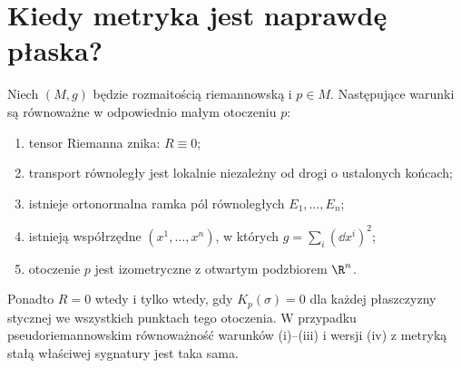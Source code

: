 \section{Kiedy metryka jest naprawdę płaska?}

\begin{twierdzenie}
\label{thm:lokalna-plaskosc}
Niech $(M,g)$ będzie rozmaitością riemannowską
i $p\in M$. Następujące warunki są równoważne
w odpowiednio małym otoczeniu $p$:
\begin{enumerate}[label=\textup{(\roman*)}]
 \item tensor Riemanna znika: $R\equiv0$;
 \item transport równoległy jest lokalnie niezależny
       od drogi o ustalonych końcach;
 \item istnieje ortonormalna ramka pól równoległych
       $E_1,\ldots,E_n$;
 \item istnieją współrzędne $(x^1,\ldots,x^n)$,
       w których $g=\sum_i(\dd x^i)^2$;
 \item otoczenie $p$ jest izometryczne z otwartym
       podzbiorem $\R^n$.
\end{enumerate}
Ponadto $R=0$ wtedy i tylko wtedy, gdy
$K_p(\sigma)=0$ dla każdej płaszczyzny stycznej
we wszystkich punktach tego otoczenia.
W przypadku pseudoriemannowskim równoważność
warunków \textup{(i)--(iii)} i wersji \textup{(iv)}
z metryką stałą właściwej sygnatury jest taka sama.
\end{twierdzenie}

